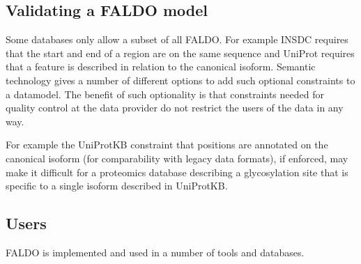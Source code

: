\subsection*{Validating a FALDO model}

Some databases only allow a subset of all FALDO. For example
INSDC requires that the start and end of a region are on the same sequence 
and UniProt requires that a feature is described in relation to the canonical isoform.
Semantic technology gives a number of different options\cite{RDFValidationReport} to add 
such optional constraints to a datamodel. 
The benefit of such optionality is that constraints needed for quality control at 
the data provider do not restrict the users of the data in any way. 

For example the UniProtKB constraint that positions are annotated on the canonical isoform 
(for comparability with legacy data formats), if enforced, may make it difficult for a proteomics
database describing a glycosylation site that is specific to a single isoform described in UniProtKB.

\subsection*{Users}
FALDO is implemented and used in a number of tools and databases.


